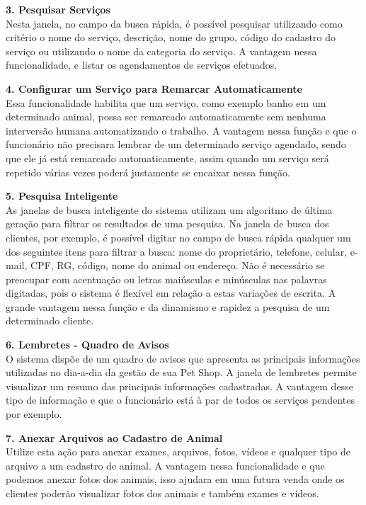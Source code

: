 \documentclass[12pt,openright,twoside,a4paper,english,french,spanish,brazil]{abntex2}
\begin{document}
\textbf{3.	Pesquisar Serviços}\\
Nesta janela, no campo da busca rápida, é possível pesquisar utilizando como critério o nome do serviço, descrição, nome do grupo, código do cadastro do serviço ou utilizando o nome da categoria do serviço. A vantagem nessa funcionalidade, e listar os agendamentos de serviços efetuados.

\textbf{4.	Configurar um Serviço para Remarcar Automaticamente}\\
Essa funcionalidade habilita que um serviço, como exemplo banho em um determinado animal, possa ser remarcado automaticamente sem nenhuma interversão humana automatizando o trabalho. A vantagem nessa função e que o funcionário não precisara lembrar de um determinado serviço agendado, sendo que ele já está remarcado automaticamente, assim quando um serviço será repetido várias vezes poderá justamente se encaixar nessa função.

\textbf{5.	Pesquisa Inteligente}\\
As janelas de busca inteligente do sistema utilizam um algoritmo de última geração para filtrar os resultados de uma pesquisa. Na janela de busca dos clientes, por exemplo, é possível digitar no campo de busca rápida qualquer um dos seguintes itens para filtrar a busca: nome do proprietário, telefone, celular, e-mail, CPF, RG, código, nome do animal ou endereço. Não é necessário se preocupar com acentuação ou letras maiúsculas e minúsculas nas palavras digitadas, pois o sistema é flexível em relação a estas variações de escrita. A grande vantagem nessa função e da dinamismo e rapidez a pesquisa de um determinado cliente.

\textbf{6.	Lembretes - Quadro de Avisos}\\
O sistema dispõe de um quadro de avisos que apresenta as principais informações utilizadas no dia-a-dia da gestão de sua Pet Shop. A janela de lembretes permite visualizar um resumo das principais informações cadastradas. A vantagem desse tipo de informação e que o funcionário está à par de todos os serviços pendentes por exemplo.

\textbf{7.	Anexar Arquivos ao Cadastro de Animal}\\
Utilize esta ação para anexar exames, arquivos, fotos, vídeos e qualquer tipo de arquivo a um cadastro de animal. A vantagem nessa funcionalidade e que podemos anexar fotos dos animais, isso ajudara em uma futura venda onde os clientes poderão visualizar fotos dos animais e também exames e vídeos.
\end{document}
